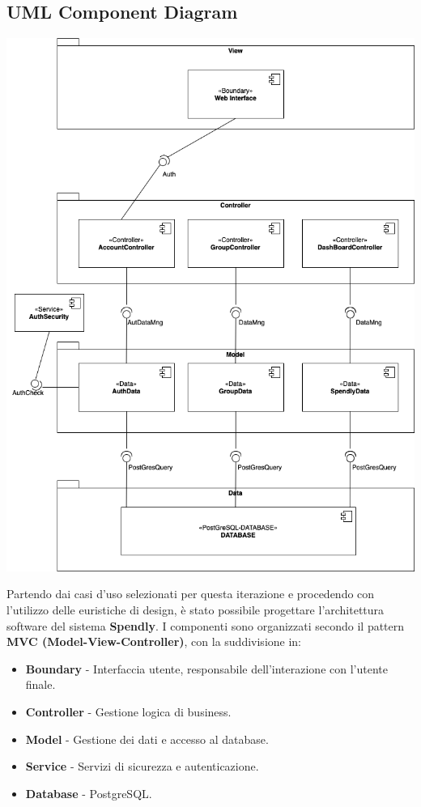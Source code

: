 \subsection{UML Component Diagram}


\begin{center}
    \includegraphics[scale=0.45]{images/ComponentDiagramV1.1.png}

\end{center}

Partendo dai casi d’uso selezionati per questa iterazione e procedendo con l’utilizzo delle euristiche di design, è stato possibile progettare l’architettura software del sistema \textbf{Spendly}.  
I componenti sono organizzati secondo il pattern \textbf{MVC (Model-View-Controller)}, con la suddivisione in:
\begin{itemize}
    \item \textbf{Boundary} - Interfaccia utente, responsabile dell'interazione con l'utente finale.
    \item \textbf{Controller} - Gestione logica di business.
    \item \textbf{Model} - Gestione dei dati e accesso al database.
    \item \textbf{Service} - Servizi di sicurezza e autenticazione.
    \item \textbf{Database} - PostgreSQL.
\end{itemize}
